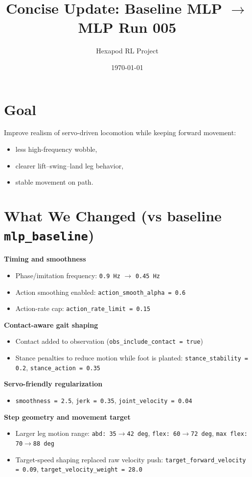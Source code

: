 \documentclass[10pt]{article}
\title{Concise Update: Baseline MLP \texorpdfstring{$\rightarrow$}{->} MLP Run 005}
\author{Hexapod RL Project}
\date{\today}
\begin{document}
\maketitle
\small

\section*{Goal}
Improve realism of servo-driven locomotion while keeping forward movement:
\begin{itemize}
  \item less high-frequency wobble,
  \item clearer lift--swing--land leg behavior,
  \item stable movement on path.
\end{itemize}

\section*{What We Changed (vs baseline \texttt{mlp\_baseline})}
\textbf{Timing and smoothness}
\begin{itemize}
  \item Phase/imitation frequency: \texttt{0.9 Hz} $\rightarrow$ \texttt{0.45 Hz}
  \item Action smoothing enabled: \texttt{action\_smooth\_alpha = 0.6}
  \item Action-rate cap: \texttt{action\_rate\_limit = 0.15}
\end{itemize}

\textbf{Contact-aware gait shaping}
\begin{itemize}
  \item Contact added to observation (\texttt{obs\_include\_contact = true})
  \item Stance penalties to reduce motion while foot is planted:
  \texttt{stance\_stability = 0.2}, \texttt{stance\_action = 0.35}
\end{itemize}

\textbf{Servo-friendly regularization}
\begin{itemize}
  \item \texttt{smoothness = 2.5}, \texttt{jerk = 0.35}, \texttt{joint\_velocity = 0.04}
\end{itemize}

\textbf{Step geometry and movement target}
\begin{itemize}
  \item Larger leg motion range:
  \texttt{abd: 35$\rightarrow$42 deg}, \texttt{flex: 60$\rightarrow$72 deg}, \texttt{max flex: 70$\rightarrow$88 deg}
  \item Target-speed shaping replaced raw velocity push:
  \texttt{target\_forward\_velocity = 0.09}, \texttt{target\_velocity\_weight = 28.0}
\end{itemize}
\end{document}
